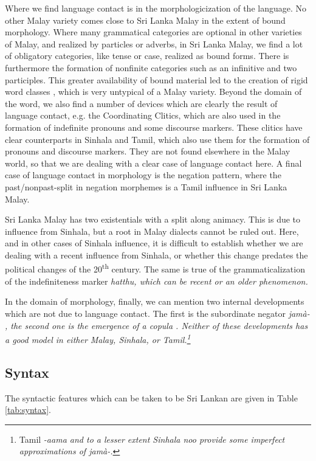 Where we find language contact is in the morphologicization of the language. No other Malay variety comes close to Sri Lanka Malay in the extent of bound morphology. Where many grammatical categories are optional in other varieties of Malay, and realized by particles or adverbs, in Sri Lanka Malay, we find a lot of obligatory categories, like tense or case, realized as bound forms. There is furthermore the formation of nonfinite categories such as an infinitive and two participles. This greater availability of bound material led to the creation of rigid word classes \citep{Nordhofffcjoat}, which is very untypical of a Malay variety. Beyond the domain of the word, we also find a number of devices which are clearly the result of language contact, e.g. the Coordinating Clitics, which are also used in the formation of indefinite pronouns and some discourse markers. These clitics have clear counterparts in Sinhala and Tamil, which also use them for the formation of pronouns and discourse markers. They are not found elsewhere in the Malay world, so that we are dealing with a clear case of language contact here. A final case of language contact in morphology is the negation  pattern, where the past/nonpast-split in negation morphemes is a Tamil influence in Sri Lanka Malay.

Sri Lanka Malay has two existentials with a split along animacy. This is due to influence from Sinhala, but a root in Malay dialects cannot be ruled out. Here, and in other cases of Sinhala influence, it is difficult to establish whether we are dealing with a recent influence from Sinhala, or whether this change predates the political changes of the 20\textsuperscript{th} century. The same is true of the grammaticalization of the indefiniteness marker \em hatthu\em, which can be recent or an older phenomenon.

In the domain of morphology, finally, we can mention two internal developments which are not due to language contact. The first is the subordinate negator \em jamà- \em \citep[\em ja\ng- \em in ][]{Slomanson2008lingua}, the second one is the emergence of a copula \citep{Nordhoff2011copula}. Neither of these developments has a good model in either Malay, Sinhala, or Tamil.\footnote{Tamil \em -aama \em and to a lesser extent Sinhala \em noo \em provide some imperfect approximations of \em jamà-\em.}

\subsection{Syntax}
The syntactic features which can be taken to be Sri Lankan are given in Table \ref{tab:syntax}.

